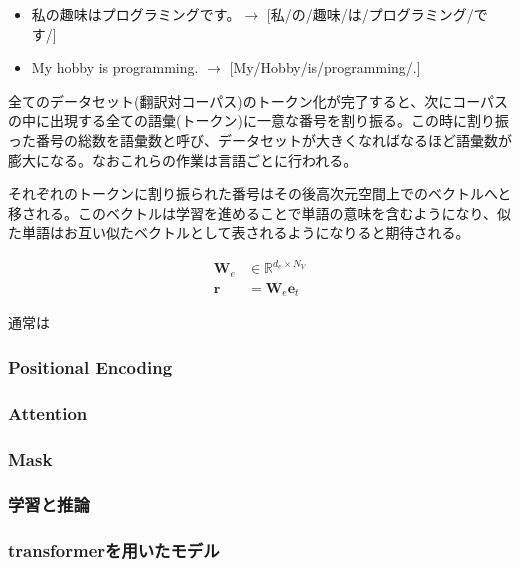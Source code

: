 \begin{itemize}
\item 私の趣味はプログラミングです。$\rightarrow$ [私/の/趣味/は/プログラミング/です/]
\item My hobby is programming. $\rightarrow$ [My/Hobby/is/programming/.]
\end{itemize}

全てのデータセット(翻訳対コーパス)のトークン化が完了すると、次にコーパスの中に出現する全ての語彙(トークン)に一意な番号を割り振る。この時に割り振った番号の総数を語彙数と呼び、データセットが大きくなればなるほど語彙数が膨大になる。なおこれらの作業は言語ごとに行われる。

それぞれのトークンに割り振られた番号はその後高次元空間上でのベクトルへと移される。このベクトルは学習を進めることで単語の意味を含むようになり、似た単語はお互い似たベクトルとして表されるようになりると期待される。


\begin{align*}
    \mathbf{W}_e &\in \mathbb{R}^{d_e\times N_V} \\ 
    \mathbf{r} &= \mathbf{W}_e \mathbf{e}_t
\end{align*}

通常は


\subsubsection{Positional Encoding}



\subsubsection{Attention}
\subsubsection{Mask}
\subsubsection{学習と推論}
\subsubsection{transformerを用いたモデル}